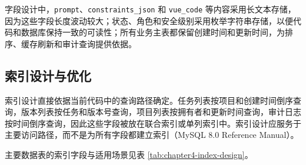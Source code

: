 字段设计中，\texttt{prompt}、\texttt{constraints\_json} 和 \texttt{vue\_code} 等内容采用长文本存储，因为这些字段长度波动较大；状态、角色和安全级别采用枚举字符串存储，以便代码和数据库保持一致的可读性；所有业务主表都保留创建时间和更新时间，为排序、缓存刷新和审计查询提供依据。

\subsection{索引设计与优化}
索引设计直接依据当前代码中的查询路径确定。任务列表按项目和创建时间倒序查询，版本列表按任务和版本号查询，项目列表按拥有者和更新时间查询，审计日志按时间倒序查询，因此这些字段被放在联合索引或单列索引中。索引设计应服务于主要访问路径，而不是为所有字段都建立索引（MySQL 8.0 Reference Manual）\cite{mysqldocs2025}。

主要数据表的索引字段与适用场景见表 \ref{tab:chapter4-index-design}。

